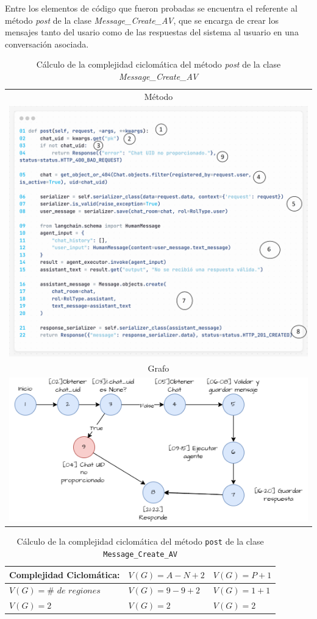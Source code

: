 Entre los elementos de código que fueron probadas se encuentra el referente al método \textit{post} de la clase
\textit{Message\_Create\_AV}, que se encarga de crear los mensajes tanto del usario como de las respuestas del sistema al usuario en una conversación asociada.

\begin{table}[h]
	\centering
	\caption{Cálculo de la complejidad ciclomática del método \textit{post} de la clase \textit{Message\_Create\_AV}}
	\label{tab:complejidad-ciclomatica}
	\begin{tabular}{|c|}
		\hline
		Método \\
		\includegraphics[width=0.4\linewidth]{images/postCreateMessage.png} \\
		\hline
		Grafo \\
		\includegraphics[width=0.4\linewidth]{images/postMessage.png} \\
		\hline
	\end{tabular}
\end{table}

\begin{table}[H]
	\centering
	\caption{Cálculo de la complejidad ciclomática del método \texttt{post} de la clase \texttt{Message\_Create\_AV}}
	\label{tab:complejidad-ciclomatica2}
	\renewcommand{\arraystretch}{1.5}
	\begin{tabular}{|>{\bfseries}m{5cm}|m{4cm}|m{4cm}|}
		\hline
		Complejidad Ciclomática: & \( V(G) = A - N + 2 \) & \( V(G) = P + 1 \) \\
		\hline
		\( V(G) = \# \textit{ de regiones} \) & \( V(G) = 9 - 9 + 2 \) & \( V(G) = 1 + 1 \) \\
		\hline
		\( V(G) = 2 \) & \( V(G) = 2 \) & \( V(G) = 2 \) \\
		\hline
	\end{tabular}
\end{table}

